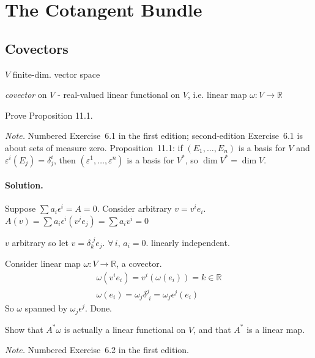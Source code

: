 \section{The Cotangent Bundle}


\subsection*{ Covectors }

$V$ finite-dim. vector space

\emph{covector} on $V$ - real-valued linear functional on $V$, i.e. linear map $\omega : V\to \mathbb{R}$



\begin{exercise}
Prove Proposition 11.1.
\end{exercise}
\noindent\emph{Note.} Numbered Exercise~6.1 in the first edition; second-edition Exercise~6.1 is about sets of measure zero. Proposition~11.1: if $(E_1,\ldots,E_n)$ is a basis for $V$ and $\varepsilon^i(E_j)=\delta^i_j$, then $(\varepsilon^1,\ldots,\varepsilon^n)$ is a basis for $V^*$, so $\dim V^*=\dim V$.
\paragraph{Solution.} Suppose $\sum a_i \epsilon^i = A = 0$.  Consider arbitrary $v= v^i e_i$.  $A(v) = \sum a_i \epsilon^i (v^j e_j) = \sum a_i v^i = 0 $

$v$ arbitrary so let $v = \delta_k^{\, \, j} e_j$.  $\forall \, i, \, a_i =0$.  linearly independent.  

Consider linear map $\omega: V \to \mathbb{R}$, a covector.  
\[
\begin{gathered}
  \omega (v^i e_i ) = v^i(\omega( e_i)) = k \in \mathbb{R} \\
  \omega(e_i) = \omega_j \delta^j_{\, \, i} = \omega_j \epsilon^j( e_i)
\end{gathered}
\]
So $\omega$ spanned by $\omega_j \epsilon^j$.  Done.  



\begin{exercise}
Show that $A^*\omega$ is actually a linear functional on $V$, and that $A^*$ is a linear map.
\end{exercise}
\noindent\emph{Note.} Numbered Exercise~6.2 in the first edition.

